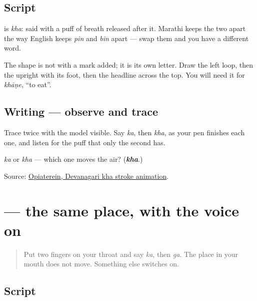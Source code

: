 \subsection*{Script}
\begin{quote}
\end{quote}

\textbf{} is \emph{kha}: \textbf{} said with a puff of breath released after it. Marathi keeps the two apart the way English keeps \emph{pin} and \emph{bin} apart — swap them and you have a different word.

The shape is not  with a mark added; it is its own letter. Draw the left loop, then the upright with its foot, then the headline across the top. You will need it for \emph{khāṇe}, \textquotedblleft{}to eat\textquotedblright{}.

\subsection*{Writing — observe and trace}

Trace \textbf{} twice with the model visible. Say \emph{ka}, then \emph{kha}, as your pen finishes each one, and listen for the puff that only the second has.

\begin{tcolorbox}[breakable,colback=teal!4,colframe=teal!35!black,title={Before you move on}]
\emph{ka} or \emph{kha} — which one moves the air? (\emph{\textbf{kha}}.)

Source: \href{https://commons.wikimedia.org/wiki/File:Deva-\%E0\%A4\%96-order.gif}{Opiaterein, Devanagari kha stroke animation}.
\end{tcolorbox}
\section[\texorpdfstring{\mr{ग} (ga)}{ग (ga)}]{ — the same place, with the voice on}

\label{lesson:MR-W06-ga}



\begin{quote}
Put two fingers on your throat and say \emph{ka}, then \emph{ga}. The place in your mouth does not move. Something else switches on.
\end{quote}

\subsection*{Script}
\begin{quote}
\end{quote}

